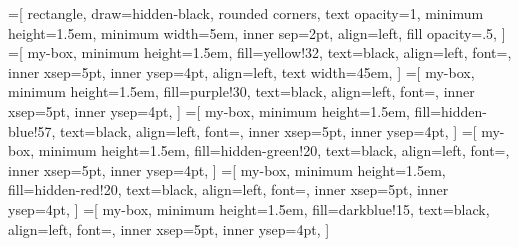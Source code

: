\documentclass{llmxive}
\begin{document}
=[
rectangle,
draw=hidden-black,
rounded corners,
text opacity=1,
minimum height=1.5em,
minimum width=5em,
inner sep=2pt,
align=left,
fill opacity=.5,
]
=[
my-box,
minimum height=1.5em,
fill=yellow!32,
text=black,
align=left,
font=\normalsize,
inner xsep=5pt,
inner ysep=4pt,
align=left,
text width=45em,
]
=[
my-box,
minimum height=1.5em,
fill=purple!30,
text=black,
align=left,
font=\normalsize,
inner xsep=5pt,
inner ysep=4pt,
]
=[
my-box,
minimum height=1.5em,
fill=hidden-blue!57,
text=black,
align=left,
font=\normalsize,
inner xsep=5pt,
inner ysep=4pt,
]
=[
my-box,
minimum height=1.5em,
fill=hidden-green!20,
text=black,
align=left,
font=\normalsize,
inner xsep=5pt,
inner ysep=4pt,
]
=[
my-box,
minimum height=1.5em,
fill=hidden-red!20,
text=black,
align=left,
font=\normalsize,
inner xsep=5pt,
inner ysep=4pt,
]
=[
my-box,
minimum height=1.5em,
fill=darkblue!15,
text=black,
align=left,
font=\normalsize,
inner xsep=5pt,
inner ysep=4pt,
]
\end{document}
